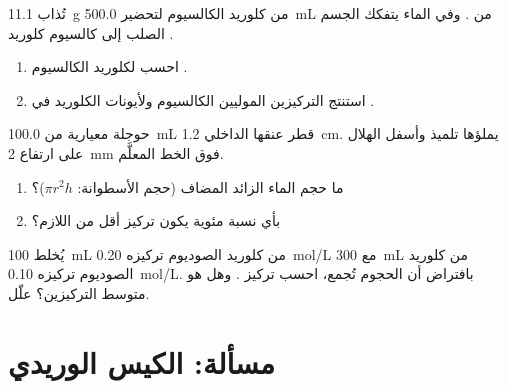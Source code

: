 \begin{exercise}[$\star\star\star$]\label{exo:g10:concentration-and-dilution:13}
تُذاب \qty{11.1}{g} من كلوريد الكالسيوم  لتحضير
\qty{500.0}{mL} من . وفي الماء يتفكك الجسم الصلب إلى  كالسيوم
  كلوريد .
\begin{enumerate}
  \item احسب  لكلوريد الكالسيوم .
  \item استنتج التركيزين الموليين  الكالسيوم ولأيونات
        الكلوريد في .
\end{enumerate}
\end{exercise}

\begin{exercise}[$\star\star\star$]\label{exo:g10:concentration-and-dilution:14}
حوجلة معيارية من \qty{100.0}{mL} قطر عنقها الداخلي
\qty{1.2}{cm}. يملؤها تلميذ وأسفل الهلال على ارتفاع
\qty{2}{mm} فوق الخط المعلَّم.
\begin{enumerate}
  \item ما حجم الماء الزائد المضاف (حجم الأسطوانة:
        $\pi r^2 h$)؟
  \item بأي نسبة مئوية يكون تركيز  أقل من اللازم؟
\end{enumerate}
\end{exercise}

\begin{exercise}[$\star\star\star$]\label{exo:g10:concentration-and-dilution:15}
يُخلط \qty{100}{mL} من  كلوريد الصوديوم تركيزه \qty{0.20}{mol/L}
مع \qty{300}{mL} من  كلوريد الصوديوم تركيزه \qty{0.10}{mol/L}.
بافتراض أن الحجوم تُجمع، احسب تركيز . وهل هو متوسط التركيزين؟
علّل.
\end{exercise}

\section{مسألة: الكيس الوريدي}

